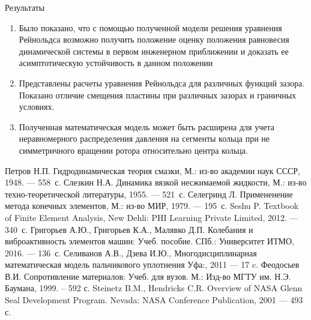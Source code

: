 \documentclass[ignoreonframetext,unicode]{beamer}
\begin{document}
\begin{frame}{Результаты}
	\begin{block}{}
	\begin{enumerate}	
		\item Было показано, что с помощью полученной модели решения уравнения Рейнольдса возможно получить положение оценку положения равновесия динамической системы в первом инженерном приближении и доказать ее асимптотическую устойчивость в данном положении
		\item Представлены расчеты уравнения Рейнольдса для различных функций зазора. Показано отличие смещения пластины при различных зазорах и граничных условиях.
		\item Полученная математическая модель может быть расширена для учета неравномерного распределения давления на сегменты кольца при не симметричного вращении ротора относительно центра кольца.
	\end{enumerate}
	\end{block}	

\end{frame}	

\begin{frame}{}
	\begin{thebibliography}{00}
		 Петров Н.П. Гидродинамическая теория смазки, М.: из-во академии наук СССР, 1948. --- 558~с.
		 Слезкин Н.А. Динамика вязкой несжимаемой жидкости, М.: из-во техно-теоретической литературы, 1955. --- 521~с.
		 Селегринд Л. Примененение метода конечных элементов, М.: из-во МИР, 1979. --- 195~с.
		 Seshu P. Textbook of
		Finite Element
		Analysis, New Dehli: PHI Learning Private Limited, 2012. --- 340~с.
		 Григорьев А.Ю., Григорьев К.А., Малявко Д.П. Колебания
		и виброактивность элементов машин: Учеб. пособие. СПб.: Университет ИТМО, 2016. --- 136~с.
		  Селиванов А.В., Дзева И.Ю., Многодисциплинарная математическая модель пальчикового уплотнения Уфа:, 2011 --- 17 c.
		 Феодосьев В.И. Сопротивление материалов: Учеб. для вузов. М.: Изд-во МГТУ им.
		Н.Э. Баумана, 1999. – 592 с.
		 Steinetz B.M., Hendricks C.R. Overview of NASA Glenn Seal Development
		Program. Nevada: NASA
		Conference Publication, 2001 --- 493 с.
		
	\end{thebibliography}
\end{frame}
\end{document}
